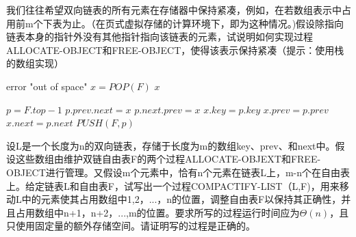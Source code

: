 \documentclass[a4paper, justified]{tufte-handout}
\begin{document}
\begin{problem}[TC 10.3-4]
我们往往希望双向链表的所有元素在存储器中保持紧凑，例如，在若数组表示中占用前m个下表为止。（在页式虚拟存储的计算环境下，即为这种情况。)假设除指向链表本身的指针外没有其他指针指向该链表的元素，试说明如何实现过程ALLOCATE-OBJECT和FREE-OBJECT，使得该表示保持紧凑（提示：使用栈的数组实现）
\end{problem}

\begin{solution}
  \begin{algorithm}
    \begin{algorithmic}
      \State error "out of space"
      \Else \State $x = POP(F)$
      \State \Return $x$
      \EndIf
      \EndFunction
    \end{algorithmic}
  \end{algorithm}
  \begin{algorithm}
    \begin{algorithmic}
      \State $p = F.top - 1$
      \State $p.prev.next = x$
      \State $p.next.prev = x$
      \State $x.key = p.key$
      \State $x.prev = p.prev$
      \State $x.next = p.next$
      \State $PUSH(F,p)$
      \EndProcedure
    \end{algorithmic}
  \end{algorithm}
\end{solution}

\begin{problem}[TC 10.3-5]
设L是一个长度为n的双向链表，存储于长度为m的数组key、prev、和next中。假设这些数组由维护双链自由表F的两个过程ALLOCATE-OBJEXT和FREE-OBJECT进行管理。又假设m个元素中，恰有n个元素在链表L上，m-n个在自由表上。给定链表L和自由表F，试写出一个过程COMPACTIFY-LIST（L,F)，用来移动L中的元素使其占用数组中1,2，...，n的位置，调整自由表F以保持其正确性，并且占用数组中n+1，n+2，...,m的位置。要求所写的过程运行时间应为$\Theta(n)$，且只使用固定量的额外存储空间。请证明写的过程是正确的。
\end{problem}
\end{document}

